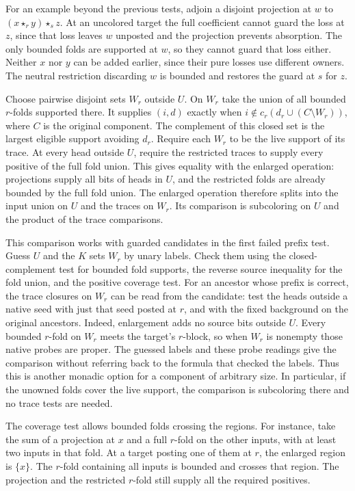 For an example beyond the previous tests, adjoin a disjoint
projection at $w$ to $(x\star_r y)\star_s z$. At an
uncolored target the full coefficient cannot guard the
loss at $z$, since that loss leaves $w$ unposted and the
projection prevents absorption. The only bounded folds
are supported at $w$, so they cannot guard that loss
either. Neither $x$ nor $y$ can be added earlier, since
their pure losses use different owners. The neutral
restriction discarding $w$ is bounded and restores the
guard at $s$ for $z$.

Choose pairwise disjoint sets $W_r$ outside $U$. On $W_r$
take the union of all bounded $r$-folds supported there.
It supplies $(i,d)$ exactly when
$i\notin c_r(d_r\cup(C\setminus W_r))$, where $C$ is
the original component. The complement of this closed
set is the largest eligible support avoiding $d_r$.
Require each $W_r$ to be the live support of its trace.
At every head outside $U$, require the restricted traces
to supply every positive of the full fold union. This
gives equality with the enlarged operation: projections
supply all bits of heads in $U$, and the restricted folds
are already bounded by the full fold union. The enlarged
operation therefore splits into the input union on $U$
and the traces on $W_r$. Its comparison is subcoloring
on $U$ and the product of the trace comparisons.

This comparison works with guarded candidates in the first
failed prefix test. Guess $U$ and the $K$ sets $W_r$ by unary
labels. Check them using the closed-complement test for
bounded fold supports, the reverse source inequality for
the fold union, and the positive coverage test. For an
ancestor whose prefix is correct, the trace closures on
$W_r$ can be read from the candidate: test the heads
outside a native seed with just that seed posted at $r$,
and with the fixed background on the original ancestors.
Indeed, enlargement adds no source bits outside $U$.
Every bounded $r$-fold on $W_r$ meets the target's
$r$-block, so when $W_r$ is nonempty those native probes
are proper. The guessed labels and these probe readings
give the comparison without referring back to the formula
that checked the labels. Thus this is another monadic
option for a component of arbitrary size. In particular,
if the unowned folds cover the live support, the comparison
is subcoloring there and no trace tests are needed.

The coverage test allows bounded folds crossing the
regions. For instance, take the sum of a projection at
$x$ and a full $r$-fold on the other inputs, with at
least two inputs in that fold. At a target posting
one of them at $r$, the enlarged region is $\{x\}$.
The $r$-fold containing all inputs is bounded and crosses
that region. The projection and the restricted $r$-fold
still supply all the required positives.

